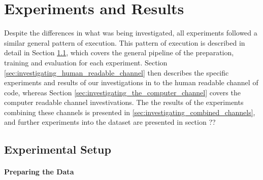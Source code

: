 \chapter{Experiments and Results}
\label{experiments_and_results}


Despite the differences in what was being investigated, all experiments followed a similar general pattern of execution. 
This pattern of execution is described in detail in Section \ref{sec:experimental_setup}, which covers the general pipeline of the preparation, training and evaluation for each experiment.
Section \ref{sec:investigating_human_readable_channel} then describes the specific experiments and results of our investigations in to the human readable channel of code, whereas Section \ref{sec:investigating_the_computer_channel} covers the computer readable channel investivations.
The the results of the experiments combining these channels is presented in \ref{sec:investigating_combined_channels}, and further experiments into the dataset are presented in section ??


\section{Experimental Setup} %
\label{sec:experimental_setup}




\subsubsection{Preparing the Data} %
\label{ssub:Preparing the Data}

